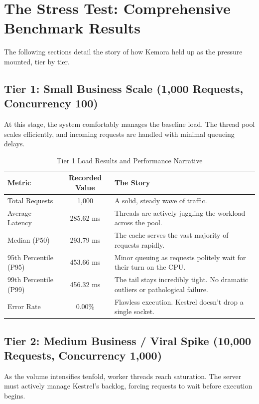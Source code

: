 \section{The Stress Test: Comprehensive Benchmark Results}
The following sections detail the story of how Kemora held up as the pressure mounted, tier by tier.

\subsection{Tier 1: Small Business Scale (1,000 Requests, Concurrency 100)}
At this stage, the system comfortably manages the baseline load. The thread pool scales efficiently, and incoming requests are handled with minimal queueing delays.

\begin{table}[H]
\centering
\renewcommand{\arraystretch}{1.3}
\begin{tabular}{|l|c|p{8cm}|}
\hline
\textbf{Metric} & \textbf{Recorded Value} & \textbf{The Story} \\ \hline
Total Requests & 1,000 & A solid, steady wave of traffic. \\ \hline
Average Latency & 285.62 ms & Threads are actively juggling the workload across the pool. \\ \hline
Median (P50) & 293.79 ms & The cache serves the vast majority of requests rapidly. \\ \hline
95th Percentile (P95) & 453.66 ms & Minor queuing as requests politely wait for their turn on the CPU. \\ \hline
99th Percentile (P99) & 456.32 ms & The tail stays incredibly tight. No dramatic outliers or pathological failure. \\ \hline
Error Rate & 0.00\% & Flawless execution. Kestrel doesn't drop a single socket. \\ \hline
\end{tabular}
\caption{Tier 1 Load Results and Performance Narrative}
\end{table}

\subsection{Tier 2: Medium Business / Viral Spike (10,000 Requests, Concurrency 1,000)}
As the volume intensifies tenfold, worker threads reach saturation. The server must actively manage Kestrel's backlog, forcing requests to wait before execution begins.

